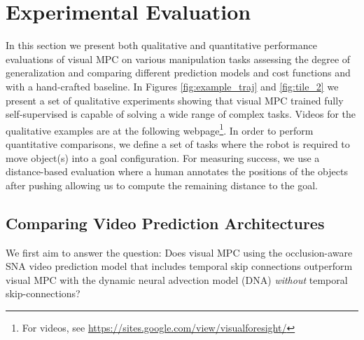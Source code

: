 \section{Experimental Evaluation}
\label{sec:experiments}
In this section we present both qualitative and quantitative  performance evaluations of visual MPC on various manipulation tasks assessing the degree of generalization and comparing different prediction models and cost functions and with a hand-crafted baseline.
In Figures \ref{fig:example_traj} and \ref{fig:tile_2} we present a set of qualitative experiments showing that visual MPC trained fully self-supervised is capable of solving a wide range of complex tasks.
Videos for the qualitative examples are at the following webpage\footnote{For videos, see \url{https://sites.google.com/view/visualforesight/}}.
In order to perform quantitative comparisons, we define a set of tasks where the robot is required to move object(s) into a goal configuration. For measuring success, we use a distance-based evaluation where a human annotates the positions of the objects after pushing allowing us to compute the remaining distance to the goal.

\subsection{Comparing Video Prediction Architectures}
\label{subsec:sna_experiments}
We first aim to answer the question: Does  visual MPC using the occlusion-aware SNA video prediction model that includes temporal skip connections outperform visual MPC with the dynamic neural advection model (DNA)\cite{foresight} \emph{without} temporal skip-connections?


